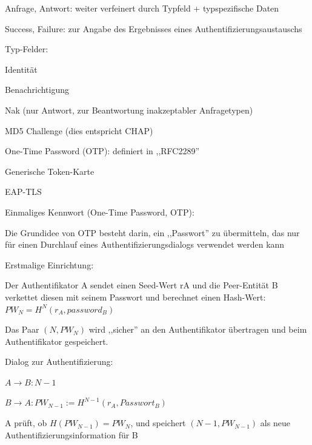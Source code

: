 \documentclass[a4paper]{article}
\begin{document}
\begin{multicols}{3}
\begin{itemize*}
\begin{itemize*}
                  \begin{itemize*} \item Anfrage, Antwort: weiter verfeinert durch Typfeld + typspezifische Daten \item Success, Failure: zur Angabe des Ergebnisses eines Authentifizierungsaustauschs \end{itemize*}
                  \item Typ-Felder:
                  \begin{itemize*} \item Identität \item Benachrichtigung \item Nak (nur Antwort, zur Beantwortung inakzeptabler Anfragetypen) \item MD5 Challenge (dies entspricht CHAP) \item One-Time Password (OTP): definiert in ,,RFC2289'' \item Generische Token-Karte \item EAP-TLS \end{itemize*}
            \end{itemize*}
            \item Einmaliges Kennwort (One-Time Password, OTP):
            \begin{itemize*}
                  \item Die Grundidee von OTP besteht darin, ein ,,Passwort'' zu übermitteln, das nur für einen Durchlauf eines Authentifizierungsdialogs verwendet werden kann
                  \item Erstmalige Einrichtung:
                  \begin{itemize*} \item Der Authentifikator A sendet einen Seed-Wert rA und die Peer-Entität B verkettet diesen mit seinem Passwort und berechnet einen Hash-Wert: $PW_N = H^N(r_A, password_B)$ \item Das Paar $(N, PW_N)$ wird ,,sicher'' an den Authentifikator übertragen und beim Authentifikator gespeichert. \end{itemize*}
                  \item Dialog zur Authentifizierung:
                  \begin{itemize*} \item $A\rightarrow B: N - 1$ \item $B\rightarrow A: PW_{N-1} := H^{N-1}(r_A, Passwort_B)$ \item A prüft, ob $H(PW_{N-1}) = PW_N$, und speichert $(N-1, PW_{N-1})$ als neue Authentifizierungsinformation für B \end{itemize*}

\end{itemize*}
\end{itemize*}
\end{multicols}
\end{document}
